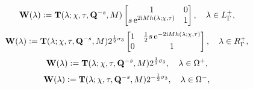 \begin{equation}
\mathbf{W}(\lambda)\vcentcolon= \mathbf{T}(\lambda;\chi,\tau,\mathbf{Q}^{-s},M) 
\begin{bmatrix} 1 & 0 \\ s \,\mathrm{e}^{2\mathrm{i} M h(\lambda;\chi,\tau)}& 1 \end{bmatrix},\quad \lambda\in L^+_{\Gamma},
\label{eq:T-to-W-L-plus-Gamma}
\end{equation}
\begin{equation}
\mathbf{W}(\lambda)\vcentcolon= \mathbf{T}(\lambda;\chi,\tau,\mathbf{Q}^{-s},M) 
2^{\frac{1}{2}\sigma_3} \begin{bmatrix} 1 & \frac{1}{2} s\,\mathrm{e}^{-2\mathrm{i} M h(\lambda;\chi,\tau)} \\ 0 & 1 \end{bmatrix},\quad \lambda \in R^+_{\Gamma},
\end{equation}
%
\begin{equation}
\mathbf{W}(\lambda)\vcentcolon= \mathbf{T}(\lambda;\chi,\tau,\mathbf{Q}^{-s},M) 
2^{\frac{1}{2}\sigma_3},\quad \lambda \in \Omega^+,
\end{equation}
\begin{equation}
\mathbf{W}(\lambda)\vcentcolon= \mathbf{T}(\lambda;\chi,\tau,\mathbf{Q}^{-s},M) 
2^{-\frac{1}{2}\sigma_3},\quad \lambda \in \Omega^-,
\end{equation}
